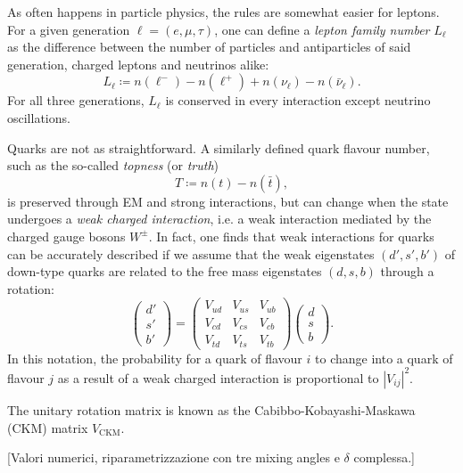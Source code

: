 As often happens in particle physics, the rules are somewhat easier for leptons. For a given generation $\ell = (e,\mu,\tau)$, one can define a \textit{lepton family number} $L_\ell$ as the difference between the number of particles and antiparticles of said generation, charged leptons and neutrinos alike:
\begin{equation}
L_\ell
\coloneqq
n(\ell^-) - n(\ell^+)
+
n(\nu_\ell) - n(\bar{\nu}_\ell).
\end{equation}
For all three generations, $L_\ell$ is conserved in every interaction except neutrino oscillations.

Quarks are not as straightforward.
A similarly defined quark flavour number, such as the so-called \textit{topness} (or \textit{truth})
\begin{equation}
T
\coloneqq
n(t) - n(\bar{t}),
\end{equation}
is preserved through EM and strong interactions, but can change when the state undergoes a \textit{weak charged interaction}, i.e. a weak interaction mediated by the charged gauge bosons $W^\pm$. In fact, one finds that weak interactions for quarks can be accurately described if we assume that the weak eigenstates $(d',s',b')$ of down-type quarks are related to the free mass eigenstates $(d,s,b)$ through a rotation:
\begin{equation}
	\begin{pmatrix}
		d' \\
		s' \\
		b'
	\end{pmatrix}
	=
	\begin{pmatrix}
		V_{ud} & V_{us} & V_{ub} \\
		V_{cd} & V_{cs} & V_{cb} \\
		V_{td} & V_{ts} & V_{tb}
	\end{pmatrix}
	\begin{pmatrix}
		d \\
		s \\
		b
	\end{pmatrix}.
	\label{eq:CKM_matrix}
\end{equation}
In this notation, the probability for a quark of flavour $i$ to change into a quark of flavour $j$ as a result of a weak charged interaction is proportional to ${\left| V_{ij} \right|}^2$.

The unitary rotation matrix is known as the Cabibbo-Kobayashi-Maskawa (CKM) matrix $V_\text{CKM}$.

[Valori numerici, riparametrizzazione con tre mixing angles e $\delta$ complessa.]

